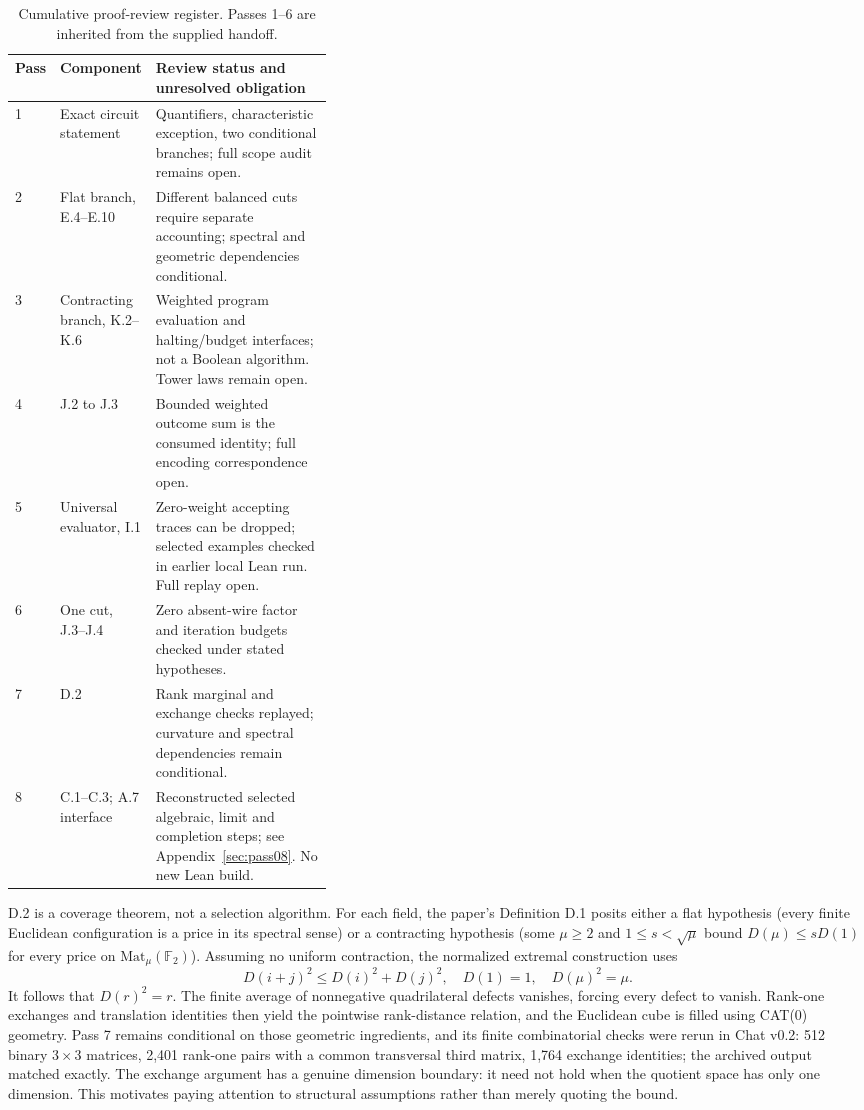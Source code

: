 \documentclass[11pt,letterpaper]{article}
\begin{document}
\begin{table}[htbp]
\small\centering
\caption{Cumulative proof-review register. Passes 1--6 are inherited from the supplied handoff.}
\begin{tabularx}{\linewidth}{p{0.09\linewidth}p{0.28\linewidth}Y}
\toprule
Pass & Component & Review status and unresolved obligation\\
 & Exact circuit statement & Quantifiers, characteristic exception, two conditional branches; full scope audit remains open.\\
2 & Flat branch, E.4--E.10 & Different balanced cuts require separate accounting; spectral and geometric dependencies conditional.\\
3 & Contracting branch, K.2--K.6 & Weighted program evaluation and halting/budget interfaces; not a Boolean algorithm. Tower laws remain open.\\
4 & J.2 to J.3 & Bounded weighted outcome sum is the consumed identity; full encoding correspondence open.\\
5 & Universal evaluator, I.1 & Zero-weight accepting traces can be dropped; selected examples checked in earlier local Lean run. Full replay open.\\
6 & One cut, J.3--J.4 & Zero absent-wire factor and iteration budgets checked under stated hypotheses.\\
7 & D.2 & Rank marginal and exchange checks replayed; curvature and spectral dependencies remain conditional.\\
8 & C.1--C.3; A.7 interface & Reconstructed selected algebraic, limit and completion steps; see Appendix~\ref{sec:pass08}. No new Lean build.\\
\bottomrule
\end{tabularx}
\end{table}

D.2 is a coverage theorem, not a selection algorithm. For each field, the paper's Definition D.1 posits either a flat hypothesis (every finite Euclidean configuration is a price in its spectral sense) or a contracting hypothesis (some $\mu\ge2$ and $1\le s<\sqrt\mu$ bound $D(\mu)\le sD(1)$ for every price on $\mathrm{Mat}_\mu(\mathbb F_2)$). Assuming no uniform contraction, the normalized extremal construction uses
\[
D(i+j)^2\le D(i)^2+D(j)^2,\quad D(1)=1,\quad D(\mu)^2=\mu.
\]
It follows that $D(r)^2=r$. The finite average of nonnegative quadrilateral defects vanishes, forcing every defect to vanish. Rank-one exchanges and translation identities then yield the pointwise rank-distance relation, and the Euclidean cube is filled using CAT(0) geometry. Pass 7 remains conditional on those geometric ingredients, and its finite combinatorial checks were rerun in Chat v0.2: 512 binary $3\times3$ matrices, 2,401 rank-one pairs with a common transversal third matrix, 1,764 exchange identities; the archived output matched exactly. The exchange argument has a genuine dimension boundary: it need not hold when the quotient space has only one dimension. This motivates paying attention to structural assumptions rather than merely quoting the bound.
\end{document}
